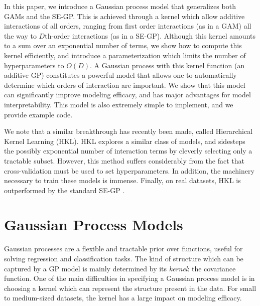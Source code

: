 In this paper, we introduce a Gaussian process model that generalizes both GAMs and the SE-GP.  This is achieved through a kernel which allow additive interactions of all orders, ranging from first order interactions (as in a GAM) all the way to $D$th-order interactions (as in a SE-GP).  Although this kernel amounts to a sum over an exponential number of terms, we show how to compute this kernel efficiently, and introduce a parameterization which limits the number of hyperparameters to $O(D)$.  A Gaussian process with this kernel function (an additive GP) constitutes a powerful model that allows one to automatically determine which orders of interaction are important.  We show that this model can significantly improve modeling efficacy, and has major advantages for model interpretability.  This model is also extremely simple to implement, and we provide example code.

We note that a similar breakthrough has recently been made, called Hierarchical Kernel Learning (HKL)\cite{DBLP:journals/corr/abs-0909-0844}.  HKL explores a similar class of models, and sidesteps the possibly exponential number of interaction terms by cleverly selecting only a tractable subset.  However, this method suffers considerably from the fact that cross-validation must be used to set hyperparameters.  In addition, the machinery necessary to train these models is immense.  Finally, on real datasets, HKL is outperformed by the standard SE-GP \cite{DBLP:journals/corr/abs-0909-0844}.

\section{Gaussian Process Models}

Gaussian processes are a flexible and tractable prior over functions, useful for solving regression and classification tasks\cite{rasmussen38gaussian}.  The kind of structure which can be captured by a GP model is mainly determined by its \emph{kernel}: the covariance function.  One of the main difficulties in specifying a Gaussian process model is in choosing a kernel which can represent the structure present in the data.  For small to medium-sized datasets, the kernel has a large impact on modeling efficacy.
  


